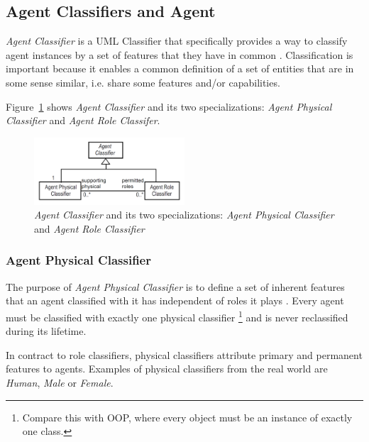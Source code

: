 \subsection{Agent Classifiers and Agent}

\textit{Agent Classifier} is a UML Classifier that specifically provides a way to classify agent instances by a set of features that they have in common \cite{Odell05}.
Classification is important because it enables a common definition of a set of entities that are in some sense similar, i.e. share some features and/or capabilities.

Figure~\ref{figure:onp-agent-classifiers} shows \textit{Agent Classifier} and its two specializations: \textit{Agent Physical Classifier} and \textit{Agent Role Classifer}.

\begin{figure}[ht]
	\centering
	\includegraphics[width=0.5\textwidth]{images/onp/agent-classifiers.png}
	\caption{\textit{Agent Classifier} and its two specializations: \textit{Agent Physical Classifier} and \textit{Agent Role Classifier}}
	\label{figure:onp-agent-classifiers}
\end{figure}

\subsubsection*{Agent Physical Classifier}

The purpose of \textit{Agent Physical Classifier} is to define a set of inherent features that an agent classified with it has independent of roles it plays \cite{Odell05}.
Every agent must be classified with exactly one physical classifier
\footnote{Compare this with OOP, where every object must be an instance of exactly one class.} and is never reclassified during its lifetime.

In contract to role classifiers, physical classifiers attribute primary and permanent features to agents.
Examples of physical classifiers from the real world are \textit{Human}, \textit{Male} or \textit{Female}.

